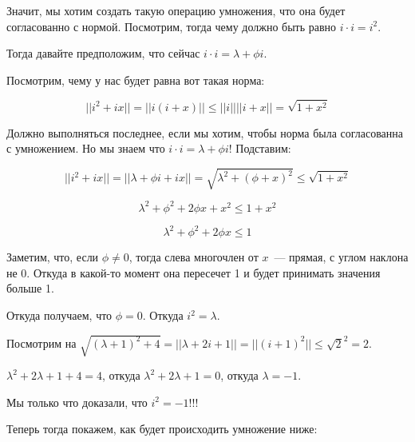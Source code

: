 \documentclass[twoside]{book}
\begin{document}
Значит, мы хотим создать такую операцию умножения, что она будет согласованно с нормой. Посмотрим, тогда чему должно быть равно \(i\cdot i = i^2\).

Тогда давайте предположим, что сейчас \(i\cdot i = \lambda + \phi i\).

Посмотрим, чему у нас будет равна вот такая норма:

$$ ||i^2+ix|| = ||i(i+x) || \leq ||i|| ||i+x|| = \sqrt{1+x^2}$$

Должно выполняться последнее, если мы хотим, чтобы норма была согласованна с умножением. Но мы знаем что  \(i\cdot i = \lambda + \phi i\)! Подставим:

$$||i^2+ix|| = || \lambda + \phi i + ix|| = \sqrt{\lambda^2 + (\phi+x)^2} \leq \sqrt{1+x^2}$$

$$\lambda^2 + \phi^2+2\phi x+x^2 \leq 1+x^2$$

$$\lambda^2 + \phi^2+2\phi x \leq 1$$

Заметим, что, если \(\phi\neq 0\), тогда слева многочлен от \(x\)~--- прямая, с углом наклона не 0. Откуда в какой-то момент она пересечет 1 и будет принимать значения больше 1.

Откуда получаем, что \(\phi=0\). Откуда $i^2 = \lambda$.

Посмотрим на \(\sqrt{(\lambda+1)^2+4}=||\lambda + 2i + 1||=||(i+1)^2||\leq \sqrt{2}^2 = 2\).

\(\lambda^2+2\lambda+1+4=4\), откуда  \(\lambda^2+2\lambda+1=0 \), откуда \(\lambda = -1\).

Мы  только что доказали, что \(i^2 =-1\)!!!

Теперь тогда покажем, как будет происходить умножение ниже:
\end{document}
